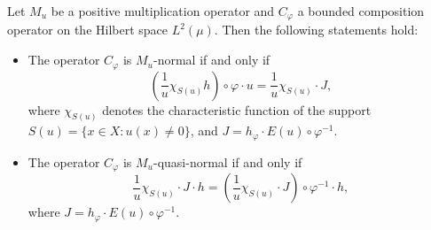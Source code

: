 \documentclass[10pt,a4paper]{amsart}
\begin{document}
\begin{thm}\label{t15}
Let \( M_u \) be a positive multiplication operator and \( C_{\varphi} \) a bounded composition operator on the Hilbert space \( L^2(\mu) \). Then the following statements hold:

\begin{itemize}
    \item[(a)] The operator \( C_{\varphi} \) is \( M_u \)-normal if and only if
    \[
    \left( \frac{1}{u} \chi_{S(u)} h \right) \circ \varphi \cdot u = \frac{1}{u} \chi_{S(u)} \cdot J,
    \]
    where \( \chi_{S(u)} \) denotes the characteristic function of the support \( S(u) = \{ x \in X : u(x) \neq 0 \} \), and \( J = h_{\varphi}  \cdot E(u) \circ \varphi^{-1} \).

    \item[(b)] The operator \( C_{\varphi} \) is \( M_u \)-quasi-normal if and only if
    \[
    \frac{1}{u} \chi_{S(u)} \cdot J \cdot h = \left( \frac{1}{u} \chi_{S(u)} \cdot J \right) \circ \varphi^{-1} \cdot h,
    \]
    where \( J = h_{\varphi}  \cdot E(u) \circ \varphi^{-1} \).
\end{itemize}
\end{thm}
\end{document}
